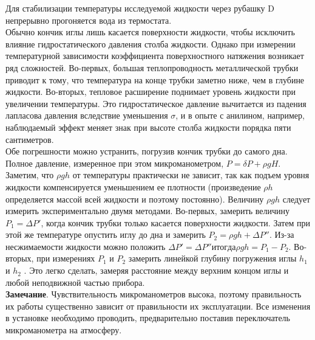 \documentclass[12pt,a4paper]{article}
\begin{document}
    Для стабилизации температуры исследуемой жидкости через рубашку D непрерывно прогоняется вода из термостата.\\
    
    Обычно кончик иглы лишь касается поверхности жидкости, чтобы исключить влияние гидростатического давления столба жидкости. Однако при измерении температурной зависимости коэффициента поверхностного натяжения возникает ряд сложностей. Во-первых, большая теплопроводность металлической трубки приводит к тому, что температура на конце трубки заметно ниже, чем в глубине жидкости. Во-вторых, тепловое расширение поднимает уровень жидкости при увеличении температуры. Это гидростатическое давление вычитается из падения лапласова давления вследствие уменьшения $\sigma$, и в опыте с анилином, например, наблюдаемый эффект меняет знак при высоте столба жидкости порядка пяти сантиметров.\\
    
    Обе погрешности можно устранить, погрузив кончик трубки до самого дна. Полное давление, измеренное при этом микроманометром, $P = \delta P + \rho g H$. Заметим, что $\rho g h$ от температуры практически не зависит, так как подъем уровня жидкости компенсируется уменьшением ее плотности (произведение $\rho h$ определяется массой всей жидкости и поэтому постоянно). Величину $\rho g h$ следует измерить экспериментально двумя методами. Во-первых, замерить величину $P_1 = \Delta P'$, когда кончик трубки только касается поверхности жидкости. Затем при этой же температуре опустить иглу до дна и замерить $P_2 = \rho g h + \Delta P''$. Из-за несжимаемости жидкости можно положить $\Delta P' = \Delta P'' и тогда \rho g h = P_1 - P_2$. Во-вторых, при измерениях $P_1$ и $P_2$ замерить линейкой глубину погружения иглы $h_1$ и $h_2$ . Это легко сделать, замеряя расстояние между верхним концом иглы и любой неподвижной частью прибора.\\

	\textbf{Замечание}. Чувствительность микроманометров высока, поэтому правильность их работы существенно зависит от правильности их эксплуатации. Все изменения в установке необходимо проводить, предварительно поставив переключатель микроманометра на атмосферу.\\
\end{document}
